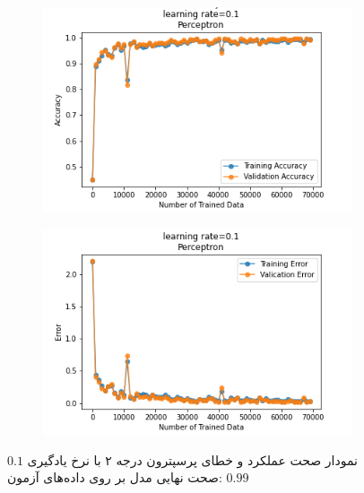 \documentclass[12pt, a4paper]{article}
\begin{document}
\begin{figure}[h]
    \begin{subfigure}{0.45\linewidth}
        \centering
        \includegraphics[width=\linewidth]{images/6/perceptron/lr/acc_0.1.png}
    \end{subfigure}
    \hfil
    \begin{subfigure}{0.45\linewidth}
        \centering
        \includegraphics[width=\linewidth]{images/6/perceptron/lr/error_0.1.png}
    \end{subfigure}
    \caption{نمودار صحت عملکرد‌ و خطای پرسپترون درجه ۲ با نرخ یادگیری $0.1$
    \newline
    صحت نهایی مدل بر روی داده‌های آزمون: $0.99$}
\end{figure}

\clearpage
\end{document}
